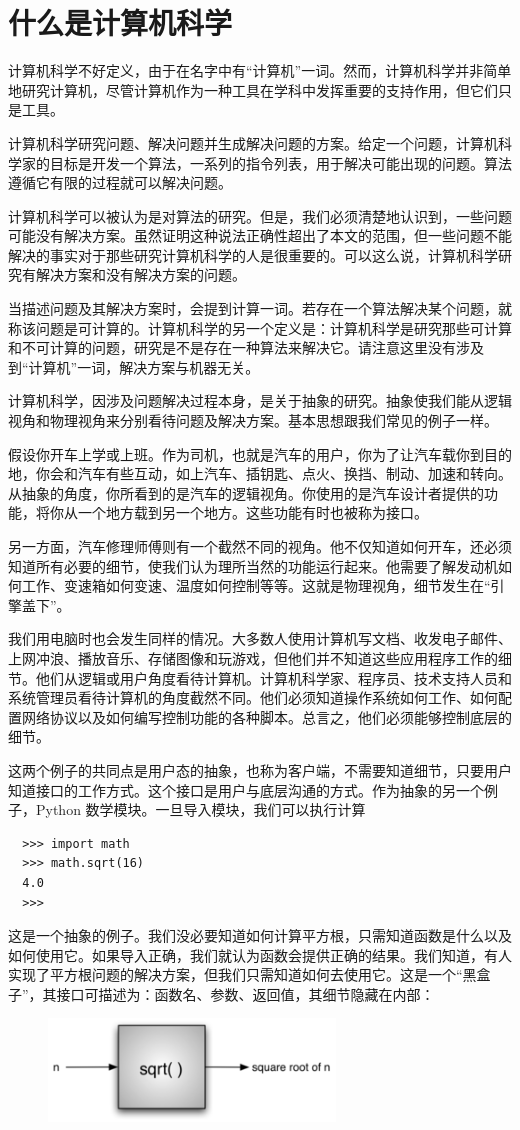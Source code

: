 \section{什么是计算机科学}


计算机科学不好定义，由于在名字中有“计算机”一词。然而，计算机科学并非简单地研究计算机，尽管计算机作为一种工具在学科中发挥重要的支持作用，但它们只是工具。


计算机科学研究问题、解决问题并生成解决问题的方案。给定一个问题，计算机科学家的目标是开发一个算法，一系列的指令列表，用于解决可能出现的问题。算法遵循它有限的过程就可以解决问题。


计算机科学可以被认为是对算法的研究。但是，我们必须清楚地认识到，一些问题可能没有解决方案。虽然证明这种说法正确性超出了本文的范围，但一些问题不能解决的事实对于那些研究计算机科学的人是很重要的。可以这么说，计算机科学研究有解决方案和没有解决方案的问题。


当描述问题及其解决方案时，会提到计算一词。若存在一个算法解决某个问题，就称该问题是可计算的。计算机科学的另一个定义是：计算机科学是研究那些可计算和不可计算的问题，研究是不是存在一种算法来解决它。请注意这里没有涉及到“计算机”一词，解决方案与机器无关。


计算机科学，因涉及问题解决过程本身，是关于抽象的研究。抽象使我们能从逻辑视角和物理视角来分别看待问题及解决方案。基本思想跟我们常见的例子一样。


假设你开车上学或上班。作为司机，也就是汽车的用户，你为了让汽车载你到目的地，你会和汽车有些互动，如上汽车、插钥匙、点火、换挡、制动、加速和转向。从抽象的角度，你所看到的是汽车的逻辑视角。你使用的是汽车设计者提供的功能，将你从一个地方载到另一个地方。这些功能有时也被称为接口。


另一方面，汽车修理师傅则有一个截然不同的视角。他不仅知道如何开车，还必须知道所有必要的细节，使我们认为理所当然的功能运行起来。他需要了解发动机如何工作、变速箱如何变速、温度如何控制等等。这就是物理视角，细节发生在“引擎盖下”。


我们用电脑时也会发生同样的情况。大多数人使用计算机写文档、收发电子邮件、上网冲浪、播放音乐、存储图像和玩游戏，但他们并不知道这些应用程序工作的细节。他们从逻辑或用户角度看待计算机。计算机科学家、程序员、技术支持人员和系统管理员看待计算机的角度截然不同。他们必须知道操作系统如何工作、如何配置网络协议以及如何编写控制功能的各种脚本。总言之，他们必须能够控制底层的细节。



这两个例子的共同点是用户态的抽象，也称为客户端，不需要知道细节，只要用户知道接口的工作方式。这个接口是用户与底层沟通的方式。作为抽象的另一个例子，Python 数学模块。一旦导入模块，我们可以执行计算
\begin{lstlisting}
  >>> import math
  >>> math.sqrt(16)
  4.0
  >>>
\end{lstlisting}


这是一个抽象的例子。我们没必要知道如何计算平方根，只需知道函数是什么以及如何使用它。如果导入正确，我们就认为函数会提供正确的结果。我们知道，有人实现了平方根问题的解决方案，但我们只需知道如何去使用它。这是一个“黑盒子”，其接口可描述为：函数名、参数、返回值，其细节隐藏在内部：
\begin{figure}[htbp]
  \centering
  \includegraphics[width=3in]{images/blackbox.png}
\end{figure}
